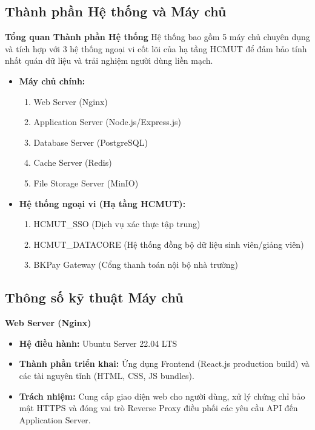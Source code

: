 \subsection{Thành phần Hệ thống và Máy chủ}
\textbf{Tổng quan Thành phần Hệ thống} Hệ thống bao gồm 5 máy chủ chuyên dụng và tích hợp với 3 hệ thống ngoại vi cốt lõi của hạ tầng HCMUT để đảm bảo tính nhất quán dữ liệu và trải nghiệm người dùng liền mạch.
\begin{itemize}
    \item \textbf{Máy chủ chính:}
    \begin{enumerate}
        \item Web Server (Nginx)
        \item Application Server (Node.js/Express.js)
        \item Database Server (PostgreSQL)
        \item Cache Server (Redis)
        \item File Storage Server (MinIO)
    \end{enumerate}
    \item \textbf{Hệ thống ngoại vi (Hạ tầng HCMUT):}
    \begin{enumerate}
        \item HCMUT\_SSO (Dịch vụ xác thực tập trung)
        \item HCMUT\_DATACORE (Hệ thống đồng bộ dữ liệu sinh viên/giảng viên)
        \item BKPay Gateway (Cổng thanh toán nội bộ nhà trường)
    \end{enumerate}
\end{itemize}

\subsection{Thông số kỹ thuật Máy chủ}
\textbf{Web Server (Nginx)} 
\begin{itemize}
    \item \textbf{Hệ điều hành:} Ubuntu Server 22.04 LTS
    \item \textbf{Thành phần triển khai:} Ứng dụng Frontend (React.js production build) và các tài nguyên tĩnh (HTML, CSS, JS bundles).
    \item \textbf{Trách nhiệm:} Cung cấp giao diện web cho người dùng, xử lý chứng chỉ bảo mật HTTPS và đóng vai trò Reverse Proxy điều phối các yêu cầu API đến Application Server.
\end{itemize}

